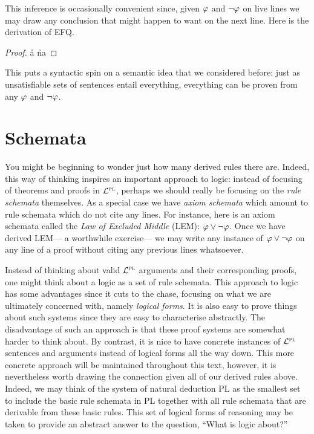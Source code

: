 This inference is occasionally convenient since, given $\varphi$ and $\neg\varphi$ on live lines we may draw any conclusion that might happen to want on the next line. 
Here is the derivation of EFQ.

\begin{proof}
  \open 
     \as{}
     \r{a}
     \r{na}
  \close
   
\end{proof}

This puts a syntactic spin on a semantic idea that we considered before: just as unsatisfiable sets of sentences entail everything, everything can be proven from any $\varphi$ and $\neg\varphi$. 


\section{Schemata}

You might be beginning to wonder just how many derived rules there are.
Indeed, this way of thinking inspires an important approach to logic: instead of focusing of theorems and proofs in $\mathcal{L}^{\textsc{pl}}$, perhaps we should really be focusing on the \textit{rule schemata} themselves.
As a special case we have \textit{axiom schemata} which amount to rule schemata which do not cite any lines.
For instance, here is an axiom schemata called the \textit{Law of Excluded Middle} (LEM): $\varphi\vee\neg\varphi$.
Once we have derived LEM--- a worthwhile exercise--- we may write any instance of $\varphi\vee\neg\varphi$ on any line of a proof without citing any previous lines whatsoever.

Instead of thinking about valid $\mathcal{L}^{\textsc{pl}}$ arguments and their corresponding proofs, one might think about a logic as a set of rule schemata.
This approach to logic has some advantages since it cuts to the chase, focusing on what we are ultimately concerned with, namely \textit{logical forms}.
It is also easy to prove things about such systems since they are easy to characterise abstractly.
The disadvantage of such an approach is that these proof systems are somewhat harder to think about.
By contrast, it is nice to have concrete instances of $\mathcal{L}^{\textsc{pl}}$ sentences and arguments instead of logical forms all the way down.
This more concrete approach will be maintained throughout this text, however, it is nevertheless worth drawing the connection given all of our derived rules above.
Indeed, we may think of the system of natural deduction PL as the smallest set to include the basic rule schemata in PL together with all rule schemata that are derivable from these basic rules.
This set of logical forms of reasoning may be taken to provide an abstract answer to the question, ``What is logic about?''


